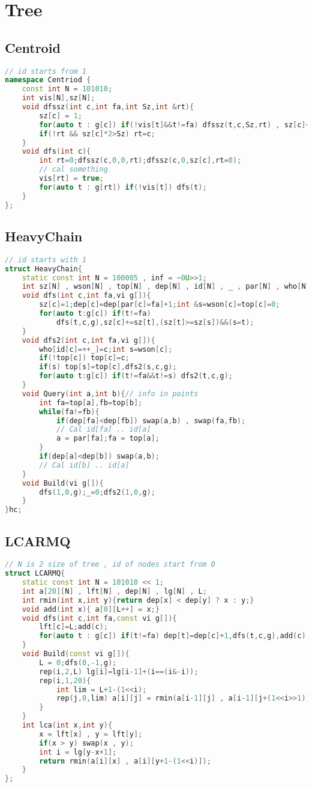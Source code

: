 \section{Tree}
\subsection{Centroid}
\begin{lstlisting}[language=C++]
// id starts from 1
namespace Centriod {
    const int N = 101010;
    int vis[N],sz[N];
    void dfssz(int c,int fa,int Sz,int &rt){
        sz[c] = 1;
        for(auto t : g[c]) if(!vis[t]&&t!=fa) dfssz(t,c,Sz,rt) , sz[c]+=sz[t];
        if(!rt && sz[c]*2>Sz) rt=c;
    }
    void dfs(int c){
        int rt=0;dfssz(c,0,0,rt);dfssz(c,0,sz[c],rt=0);
        // cal something
        vis[rt] = true;
        for(auto t : g[rt]) if(!vis[t]) dfs(t);
    }
};
\end{lstlisting}
\subsection{HeavyChain}
\begin{lstlisting}[language=C++]
// id starts with 1
struct HeavyChain{
    static const int N = 100005 , inf = ~0U>>1;
    int sz[N] , wson[N] , top[N] , dep[N] , id[N] , _ , par[N] , who[N];
    void dfs(int c,int fa,vi g[]){
        sz[c]=1;dep[c]=dep[par[c]=fa]+1;int &s=wson[c]=top[c]=0;
        for(auto t:g[c]) if(t!=fa)
            dfs(t,c,g),sz[c]+=sz[t],(sz[t]>=sz[s])&&(s=t);
    }
    void dfs2(int c,int fa,vi g[]){
        who[id[c]=++_]=c;int s=wson[c];
        if(!top[c]) top[c]=c;
        if(s) top[s]=top[c],dfs2(s,c,g);
        for(auto t:g[c]) if(t!=fa&&t!=s) dfs2(t,c,g);
    }
    void Query(int a,int b){// info in points
        int fa=top[a],fb=top[b];
        while(fa!=fb){
            if(dep[fa]<dep[fb]) swap(a,b) , swap(fa,fb);
            // Cal id[fa] .. id[a]
            a = par[fa];fa = top[a];
        }
        if(dep[a]<dep[b]) swap(a,b);
        // Cal id[b] .. id[a]
    }
    void Build(vi g[]){
        dfs(1,0,g);_=0;dfs2(1,0,g);
    }
}hc;
\end{lstlisting}
\subsection{LCARMQ}
\begin{lstlisting}[language=C++]
// N is 2 size of tree , id of nodes start from 0
struct LCARMQ{
    static const int N = 101010 << 1;
    int a[20][N] , lft[N] , dep[N] , lg[N] , L;
    int rmin(int x,int y){return dep[x] < dep[y] ? x : y;}
    void add(int x){ a[0][L++] = x;}
    void dfs(int c,int fa,const vi g[]){
        lft[c]=L;add(c);
        for(auto t : g[c]) if(t!=fa) dep[t]=dep[c]+1,dfs(t,c,g),add(c);
    }
    void Build(const vi g[]){
        L = 0;dfs(0,-1,g);
        rep(i,2,L) lg[i]=lg[i-1]+(i==(i&-i));
        rep(i,1,20){
            int lim = L+1-(1<<i);
            rep(j,0,lim) a[i][j] = rmin(a[i-1][j] , a[i-1][j+(1<<i>>1)]);
        }
    }
    int lca(int x,int y){
        x = lft[x] , y = lft[y];
        if(x > y) swap(x , y);
        int i = lg[y-x+1];
        return rmin(a[i][x] , a[i][y+1-(1<<i)]);
    }
};
\end{lstlisting}
